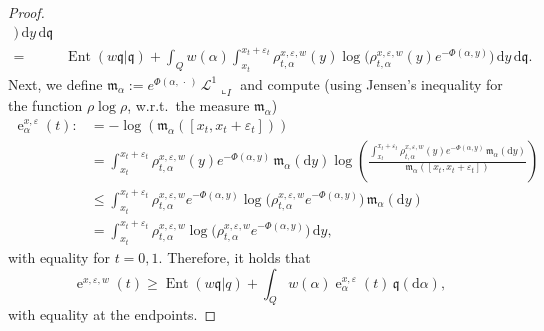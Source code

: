 \documentclass[12pt,a4paper]{amsart}
\theoremstyle{plain}
\theoremstyle{definition}
\numberwithin{equation}{section}
\let\temp\phi
\let\phi\varphi
\let\temp\epsilon
\let\epsilon\varepsilon
\let\varepsilon\temp
\DeclareMathOperator{\Ent}{Ent}
\DeclareMathOperator{\ee}{e}
\newcommand{\de}{{\mathrm{d}}}
\newcommand{\dotargument}{\,\cdot\,}
\renewcommand{\L}{\mathcal{L}}
\newcommand{\q}{\mathfrak{q}}
\newcommand{\mm}{\mathfrak m}
\begin{document}
\begin{proof}
\begin{align*}
        \big)
        \,
        \de y
        \,
        \de\q
    \\
    =&
      \Ent(w\q|\q)
      +
        \int_Q
         w(\alpha)
        \int_{x_t}^{x_t+\epsilon_t}
         \rho^{x,\epsilon,w}_{t,\alpha}(y)
    \log
    \big(
        \rho^{x,\epsilon,w}_{t,\alpha}(y)
        e^{-\Phi(\alpha,y)}
        \big)
        \,
        \de y
        \,
        \de\q
       .
  \end{align*}
  Next, we define
  $\mm_\alpha:=e^{\Phi(\alpha,\dotargument)}\,\L^1\llcorner_{I}$ and
  compute (using Jensen's inequality for the function $\rho\log\rho$,
  w.r.t.\ the measure $\mm_\alpha$)
  \begin{align*}
    \ee_\alpha^{x,\epsilon}(t)
    :&=
      -
      \log(
      \mm_\alpha([x_t,x_t+\epsilon_t])
      )
      \iffalse
      =
      \log\left(
      \frac{1}{
      \mm_\alpha([x_t,x_t+\epsilon_t])
      }
      \right)
      =
      \log
      \left(
      \frac{
      \int_{x_t}^{x_t+\epsilon_t}
      \rho^{x,\epsilon,w}_{t,\alpha}(y)
      e^{-\Phi(\alpha,y)}
      \,
      \mm_\alpha(\de y)
      }{\mm_\alpha([x_t,x_t+\epsilon_t])}
      \right)
      \fi
    \\
    &
      =
      \int_{x_t}^{x_t+\epsilon_t}
      \rho^{x,\epsilon,w}_{t,\alpha}(y)
      e^{-\Phi(\alpha,y)}
      \,
      \mm_\alpha(\de y)
      \log
      \left(
      \frac{
      \int_{x_t}^{x_t+\epsilon_t}
      \rho^{x,\epsilon,w}_{t,\alpha}(y)
      e^{-\Phi(\alpha,y)}
      \,
      \mm_\alpha(\de y)
      }{\mm_\alpha([x_t,x_t+\epsilon_t])}
      \right)
          \\
    &
\leq
      \int_{x_t}^{x_t+\epsilon_t}
      \rho^{x,\epsilon,w}_{t,\alpha}
      e^{-\Phi(\alpha,y)}
      \log
      \big(
      \rho^{x,\epsilon,w}_{t,\alpha}
      e^{-\Phi(\alpha,y)}
      \big)
      \,
      \mm_\alpha(\de y)
    \\
    &
      =
      \int_{x_t}^{x_t+\epsilon_t}
      \rho^{x,\epsilon,w}_{t,\alpha}
      \log
      \big(
      \rho^{x,\epsilon,w}_{t,\alpha}
      e^{-\Phi(\alpha,y)}
      \big)
      \,
      \de y
    ,
  \end{align*}
  with equality for $t=0,1$.
%
  Therefore, it holds that
  \begin{equation}
    \ee^{x,\epsilon,w}(t)
    \geq
    \Ent(w\q|q)
    +
    \int_Q
    w(\alpha)
    \ee_\alpha^{x,\epsilon}
    (t)
    \,
    \q(\de\alpha)
    ,
  \end{equation}
  with equality at the endpoints.

\end{proof}
\end{document}

